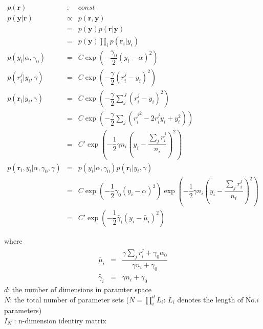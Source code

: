 \documentclass[platex, a4paper]{jsarticle}
\begin{document}
\begin{eqnarray}
  p(\bm{r}) &:& const \\
  p\left( \bm{y} |\bm{r}\right) &\propto&  p\left( \bm{r} ,\bm{y}\right) \\
    &=& p\left( \bm{y} \right) p\left( \bm{r} |\bm{y}\right) \\
    &=& p\left( \bm{y} \right) \prod_i p\left( \bm{r}_i |y_i \right) \\
  p\left( y_{i} | \alpha, \gamma_0 \right)
    &=& C\exp \left( -\dfrac {\gamma_0} {2} \left( y_{i}-\alpha \right) ^{2}\right) \\
  p(r_{i}^{j} | y_{i}, \gamma)
    &=& C\exp \left( -\dfrac {\gamma} {2} \left( r_{i}^{j}-y_{i}\right) ^{2}\right) \\
  p\left( \bm{r}_i | y_i, \gamma \right)
    &=& C\exp \left( -\dfrac {\gamma} {2}\sum_{j}^J \left( r_{i}^{j}-y_{i}\right) ^{2}\right) \\
    &=& C\exp \left( -\dfrac {\gamma} {2}\sum_{j}\left( {r_{i}^{j}}^2-2r_{i}^{j}y_{i}+y_{i}^{2}\right) \right) \\
    &=& C'\exp \left( -\dfrac {1} {2}\gamma n_{i}\left( y_{i}-\dfrac {\sum _{j}r_{i}^{j}} {n_{i}}\right) ^{2}\right) \\
  p\left( \bm{r}_i ,y_i | \alpha, \gamma_0, \gamma \right) &=& p\left( y_i | \alpha, \gamma_0 \right) p\left( \bm{r}_i | y_i, \gamma \right) \\
    &=& C\exp \left( -\dfrac {1} {2} \gamma_0 \left( y_{i}-\alpha \right) ^{2}\right)
    \exp \left( -\dfrac {1} {2}\gamma n_{i}\left( y_{i}-\dfrac {\sum _{j}r_{i}^{j}} {n_{i}}\right) ^{2}\right) \\
    &=& C'\exp \left( - \dfrac {1} {2} \tilde{\gamma_i} \left( y_{i} - \tilde {\mu_i} \right) ^{2}  \right)
\end{eqnarray}

where
\begin{eqnarray}
  \tilde{\mu_i} &=& \dfrac {\gamma \sum _{j}r_{i}^{j}+\gamma_0\alpha _{0}} {\gamma n_{i}+\gamma _{0}} \\
  \tilde{\gamma_i} &=& \gamma n_{i}+\gamma _{0}
\end{eqnarray}
$d$: the number of dimensions in paramter space \\
$N$: the total number of parameter sets ($N=\prod_i^d L_i$: $L_i$ denotes the length of No.$i$ parameters) \\
$I_{N}$ : n-dimension identiry matrix
\end{document}
